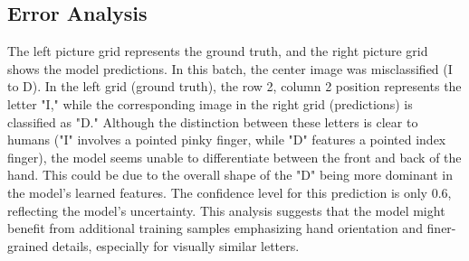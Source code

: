 \documentclass[a4paper]{article}
\begin{document}
\subsection{Error Analysis}
The left picture grid represents the ground truth, and the right picture grid shows the model predictions.
In this batch, the center image was misclassified (I to D). In the left grid (ground truth), the row 2, column 2 position represents the letter "I," while the corresponding image in the right grid (predictions) is classified as "D."
Although the distinction between these letters is clear to humans ("I" involves a pointed pinky finger, while "D" features a pointed index finger), the model seems unable to differentiate between the front and back of the hand. 
This could be due to the overall shape of the "D" being more dominant in the model's learned features. The confidence level for this prediction is only 0.6, reflecting the model's uncertainty.
This analysis suggests that the model might benefit from additional training samples emphasizing hand orientation and finer-grained details, especially for visually similar letters.
\end{document}
